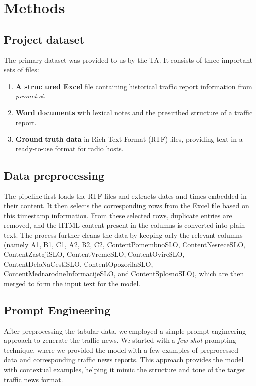 \documentclass[fleqn,moreauthors,10pt]{ds_report}
\begin{document}
\section{Methods}

\subsection*{Project dataset}

The primary dataset was provided to us by the TA. It consists of three important sets of files:

\begin{enumerate}
    \item \textbf{A structured Excel }file containing historical traffic report information from \textit{promet.si}.
    \item \textbf{Word documents} with lexical notes and the prescribed structure of a traffic report.
    \item \textbf{Ground truth data} in Rich Text Format (RTF) files, providing text in a ready-to-use format for radio hosts.
\end{enumerate}


\subsection*{Data preprocessing}
The pipeline first loads the RTF files and extracts dates and times embedded in their content. It then selects the corresponding rows from the Excel file based on this timestamp information. From these selected rows, duplicate entries are removed, and the HTML content present in the columns is converted into plain text. The process further cleans the data by keeping only the relevant columns (namely A1, B1, C1, A2, B2, C2, ContentPomembnoSLO, ContentNesreceSLO, ContentZastojiSLO, ContentVremeSLO, ContentOvireSLO, ContentDeloNaCestiSLO, ContentOpozorilaSLO, ContentMednarodneInformacijeSLO, and ContentSplosnoSLO), which are then merged to form the input text for the model.


\subsection*{Prompt Engineering}

After preprocessing the tabular data, we employed a simple prompt engineering approach to generate the traffic news.
We started with a \textit{few-shot} prompting \cite{promptingguide_fewshot} technique, where we provided the model
with a few examples of preprocessed data and corresponding traffic news reports. This approach provides the model
with contextual examples, helping it mimic the structure and tone of the target traffic news format.
\end{document}
